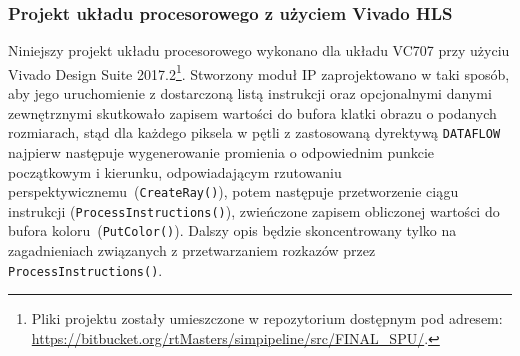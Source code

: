 \subsubsection{Projekt układu procesorowego z użyciem Vivado HLS}
Niniejszy projekt układu procesorowego wykonano dla układu VC707 przy użyciu Vivado Design Suite 2017.2\footnote{Pliki projektu zostały umieszczone w repozytorium dostępnym pod adresem:
\url{https://bitbucket.org/rtMasters/simpipeline/src/FINAL_SPU/}.}. Stworzony moduł IP zaprojektowano w taki sposób, aby jego uruchomienie z dostarczoną listą instrukcji oraz opcjonalnymi danymi zewnętrznymi skutkowało zapisem wartości do bufora klatki obrazu o podanych rozmiarach, stąd dla każdego piksela w pętli z zastosowaną dyrektywą \texttt{DATAFLOW} najpierw następuje wygenerowanie promienia o odpowiednim punkcie początkowym i kierunku, odpowiadającym rzutowaniu perspektywicznemu~(\texttt{CreateRay()}), potem następuje przetworzenie ciągu instrukcji (\texttt{ProcessInstructions()}), zwieńczone zapisem obliczonej wartości do bufora koloru~(\texttt{PutColor()}). Dalszy opis będzie skoncentrowany tylko na zagadnieniach związanych z przetwarzaniem rozkazów przez \texttt{ProcessInstructions()}.
